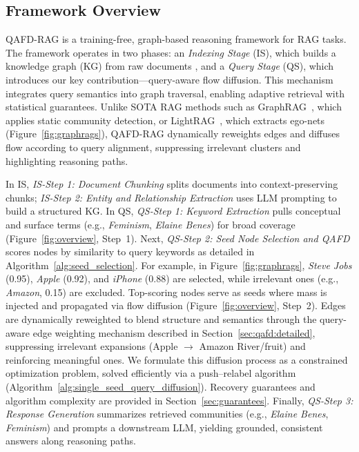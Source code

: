 \documentclass{article} %
\begin{document}
\subsection{{Framework Overview}}
 QAFD-RAG is a training-free, graph-based reasoning framework for RAG tasks.  
The framework operates in two phases: an \textit{Indexing Stage} (IS), which builds a knowledge graph (KG) from raw documents \citep{chen2025pathrag,guo2024lightrag}, and a \textit{Query Stage} (QS), which introduces our key contribution—query-aware flow diffusion. This mechanism integrates query semantics into graph traversal, enabling adaptive retrieval with statistical guarantees. Unlike SOTA RAG methods such as GraphRAG~\citep{edge2024local}, which applies static community detection, or LightRAG~\citep{guo2024lightrag}, which extracts ego-nets (Figure~\ref{fig:graphrags}), QAFD-RAG dynamically reweights edges and diffuses flow according to query alignment, suppressing irrelevant clusters and highlighting reasoning paths. 

In IS, \textit{IS-Step 1: Document Chunking} splits documents into context-preserving chunks; \textit{IS-Step 2: Entity and Relationship Extraction} uses LLM prompting to build a structured KG. In QS, \textit{QS-Step 1: Keyword Extraction} pulls conceptual and surface terms (e.g., \textit{Feminism}, \textit{Elaine Benes}) for broad coverage (Figure~\ref{fig:overview}, Step~1). Next, \textit{QS-Step 2: Seed Node Selection and QAFD} scores nodes by similarity to query keywords {as detailed in Algorithm~\ref{alg:seed_selection}}. For example, in Figure~\ref{fig:graphrags}, \textit{Steve Jobs} (0.95), \textit{Apple} (0.92), and \textit{iPhone} (0.88) are selected, while irrelevant ones (e.g., \textit{Amazon}, 0.15) are excluded.  Top-scoring nodes serve as seeds where mass is injected and propagated via flow diffusion (Figure~\ref{fig:overview}, Step~2). Edges are dynamically reweighted to blend structure and semantics {through the query-aware edge weighting mechanism described in Section~\ref{sec:qafd:detailed}}, suppressing irrelevant expansions (Apple $\to$ Amazon River/fruit) and reinforcing meaningful ones. { We formulate this diffusion process as a constrained optimization problem, solved efficiently via a push–relabel algorithm (Algorithm~\ref{alg:single_seed_query_diffusion}). Recovery guarantees and algorithm complexity are provided in Section~\ref{sec:guarantees}.} Finally, \textit{QS-Step 3: Response Generation} summarizes retrieved communities (e.g., \textit{Elaine Benes}, \textit{Feminism}) and prompts a downstream LLM, yielding grounded, consistent answers along reasoning paths.
\end{document}
